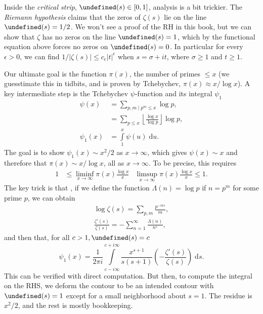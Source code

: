\documentclass[11pt,
        usenames, %
        dvipsnames %
    ]{report}
\newcommand*{\abs}[1]{\left|#1\right|}
\newcommand*{\p}[1]{\left(#1\right)}
\let\Re\undefined
\DeclareMathOperator{\Re}{Re}
\begin{document}
\begin{itemize}
        Inside the \emph{critical strip}, $\Re(s) \in [0, 1]$, analysis is a bit
        trickier. The \emph{Riemann hypothesis} claims that the zeros of
        $\zeta(s)$ lie on the line $\Re(s) = 1/2$. We won't see a proof of the
        RH in this book, but we can show that $\zeta$ has no zeros on the line
        $\Re(s) = 1$, which by the functional equation above forces no zeros on
        $\Re(s) = 0$. In particular for every $\epsilon > 0$, we can find $1 /
        \abs{\zeta(s)} \leq c_\epsilon \abs{t}^\epsilon$ when $s = \sigma + it$,
        where $\sigma \geq 1$ and $t \geq 1$.

        Our ultimate goal is the function $\pi(x)$, the number of primes $\leq
        x$ (we guesstimate this in tidbits, and is proven by Tchebychev, $\pi(x)
        \approx x / \log x$). A key intermediate step is the Tchebychev
        $\psi$-function and its integral $\psi_1$
        \begin{align}
            \psi(x) &= \sum\limits_{p, m \mid p^m \leq x}\log p,\\
                &= \sum\limits_{p \leq x}\left\lfloor \frac{\log x}{\log p}
                    \right\rfloor \log p,\\
            \psi_1(x) &= \int\limits_1^x \psi(u)\;\mathrm{d}u.
        \end{align}
        The goal is to show $\psi_1(x) \sim x^2/2$ as $x \to \infty$, which
        gives $\psi(x) \sim x$ and therefore that $\pi(x) \sim x / \log x$, all
        as $x \to \infty$. To be precise, this requires
        \begin{align}
            1 &\leq \liminf_{x \to \infty}\pi(x) \frac{\log x}{x} &
            \limsup_{x \to \infty} \pi(x) \frac{\log x}{x} \leq 1.
        \end{align}
        The key trick is that , if we define the function $\Lambda(n) = \log p$
        if $n = p^m$ for some prime $p$, we can obtain
        \begin{align}
            \log \zeta(s) = \sum\limits_{p, m}\frac{p^{-ms}}{m},\\
            \frac{\zeta'(s)}{\zeta(s)} = -\sum\limits_{n = 1}^\infty
                \frac{\Lambda(n)}{n^s},
        \end{align}
        and then that, for all $c > 1, \Re(s) = c$
        \begin{equation}
            \psi_1(x) = \frac{1}{2\pi i}\int\limits_{c - i\infty}
                ^{c + i\infty} \frac{x^{s + 1}}{s(s + 1)}
                    \p{-\frac{\zeta'(s)}{\zeta(s)}}\;\mathrm{d}s.
        \end{equation}
        This can be verified with direct computation. But then, to compute the
        integral on the RHS, we deform the contour to be an intended contour
        with $\Re(s) = 1$ except for a small neighborhood about $s = 1$. The
        residue is $x^2/2$, and the rest is mostly bookkeeping.
\end{itemize}
\end{document}
